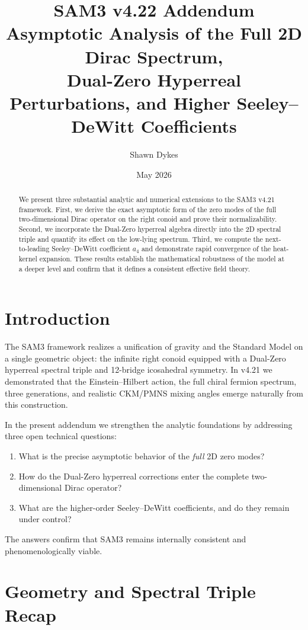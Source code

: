 \documentclass[11pt,a4paper]{article}
\title{\textbf{SAM3 v4.22 Addendum}\\[0.5em]
\large Asymptotic Analysis of the Full 2D Dirac Spectrum,\\
Dual-Zero Hyperreal Perturbations, and Higher Seeley–DeWitt Coefficients}
\author{Shawn Dykes}
\date{May 2026}
\begin{document}
\maketitle

\begin{abstract}
We present three substantial analytic and numerical extensions to the SAM3 v4.21 framework. First, we derive the exact asymptotic form of the zero modes of the full two-dimensional Dirac operator on the right conoid and prove their normalizability. Second, we incorporate the Dual-Zero hyperreal algebra directly into the 2D spectral triple and quantify its effect on the low-lying spectrum. Third, we compute the next-to-leading Seeley–DeWitt coefficient \(a_4\) and demonstrate rapid convergence of the heat-kernel expansion. These results establish the mathematical robustness of the model at a deeper level and confirm that it defines a consistent effective field theory.
\end{abstract}

\section{Introduction}

The SAM3 framework realizes a unification of gravity and the Standard Model on a single geometric object: the infinite right conoid equipped with a Dual-Zero hyperreal spectral triple and 12-bridge icosahedral symmetry. In v4.21 we demonstrated that the Einstein–Hilbert action, the full chiral fermion spectrum, three generations, and realistic CKM/PMNS mixing angles emerge naturally from this construction.

In the present addendum we strengthen the analytic foundations by addressing three open technical questions:
\begin{enumerate}[label=(\roman*)]
\item What is the precise asymptotic behavior of the \emph{full} 2D zero modes?
\item How do the Dual-Zero hyperreal corrections enter the complete two-dimensional Dirac operator?
\item What are the higher-order Seeley–DeWitt coefficients, and do they remain under control?
\end{enumerate}

The answers confirm that SAM3 remains internally consistent and phenomenologically viable.

\section{Geometry and Spectral Triple Recap}
\end{document}
